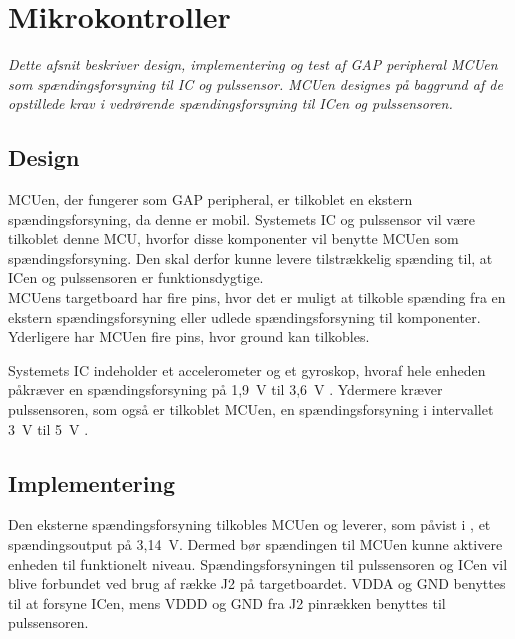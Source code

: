 \section{Mikrokontroller}
\textit{Dette afsnit beskriver design, implementering og test af GAP peripheral MCUen som spændingsforsyning til IC og pulssensor. MCUen designes på baggrund af de opstillede krav i  vedrørende spændingsforsyning til ICen og pulssensoren.}


\subsection{Design}
MCUen, der fungerer som GAP peripheral, er tilkoblet en ekstern spændingsforsyning, da denne er mobil. Systemets IC og pulssensor vil være tilkoblet denne MCU, hvorfor disse komponenter vil benytte MCUen som spændingsforsyning. Den skal derfor kunne levere tilstrækkelig spænding til, at ICen og pulssensoren er funktionsdygtige. \\
MCUens targetboard har fire pins, hvor det er muligt at tilkoble spænding fra en ekstern spændingsforsyning eller udlede spændingsforsyning til komponenter. Yderligere har MCUen fire pins, hvor ground kan tilkobles. \citep{Semiconductor2016}

Systemets IC indeholder et accelerometer og et gyroskop, hvoraf hele enheden påkræver en spændingsforsyning på 1,9~V til 3,6~V \citep{Jimb02016}. Ydermere kræver pulssensoren, som også er tilkoblet MCUen, en spændingsforsyning i intervallet 3~V til 5~V \citep{Murphy2016}.

\subsection{Implementering}
Den eksterne spændingsforsyning tilkobles MCUen og leverer, som påvist i , et spændingsoutput på 3,14~V. Dermed bør spændingen til MCUen kunne aktivere enheden til funktionelt niveau. %
Spændingsforsyningen til pulssensoren og ICen vil blive forbundet ved brug af række J2 på targetboardet. VDDA og GND benyttes til at forsyne ICen, mens VDDD og GND fra J2 pinrækken benyttes til pulssensoren.

